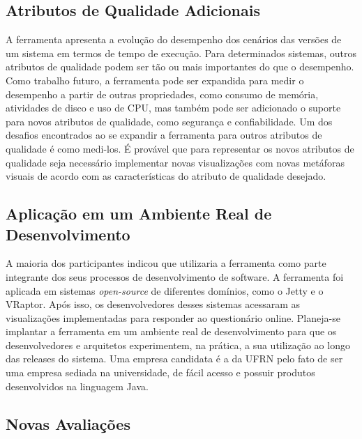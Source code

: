 \subsection{Atributos de Qualidade Adicionais}

A ferramenta apresenta a evolução do desempenho dos cenários das versões de um sistema em termos de tempo de execução. Para determinados sistemas, outros atributos de qualidade podem ser tão ou mais importantes do que o desempenho. Como trabalho futuro, a ferramenta pode ser expandida para medir o desempenho a partir de outras propriedades, como consumo de memória, atividades de disco e uso de CPU, mas também pode ser adicionado o suporte para novos atributos de qualidade, como segurança e confiabilidade. Um dos desafios encontrados ao se expandir a ferramenta para outros atributos de qualidade é como medi-los. É provável que para representar os novos atributos de qualidade seja necessário implementar novas visualizações com novas metáforas visuais de acordo com as características do atributo de qualidade desejado.

\subsection{Aplicação em um Ambiente Real de Desenvolvimento}

A maioria dos participantes indicou que utilizaria a ferramenta como parte integrante dos seus processos de desenvolvimento de software. A ferramenta foi aplicada em sistemas \textit{open-source} de diferentes domínios, como o Jetty e o VRaptor. Após isso, os desenvolvedores desses sistemas acessaram as visualizações implementadas para responder ao questionário online. Planeja-se implantar a ferramenta em um ambiente real de desenvolvimento para que os desenvolvedores e arquitetos experimentem, na prática, a sua utilização ao longo das releases do sistema. Uma empresa candidata é a da UFRN pelo fato de ser uma empresa sediada na universidade, de fácil acesso e possuir produtos desenvolvidos na linguagem Java.

\subsection{Novas Avaliações}

